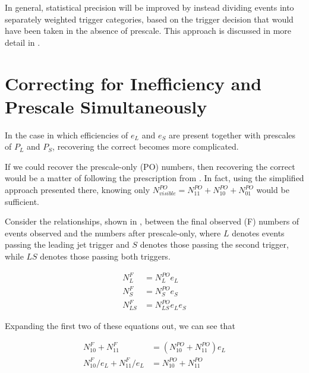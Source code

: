In general, statistical precision will be improved by instead %
dividing events into separately weighted trigger categories, based on the trigger
decision that would have been taken in the absence of prescale. This approach
is discussed in more detail in .

\section{Correcting for Inefficiency and Prescale Simultaneously}
In the case in which efficiencies of $e_L$ and $e_S$ are present together with
prescales of $P_L$ and $P_S$, recovering the correct \xs becomes more complicated.

If we could recover the prescale-only (PO) numbers, then recovering the correct
\xs would be a matter of following the prescription from .
In fact, using the simplified approach presented there, knowing only $N^{PO}_{visible} = N^{PO}_{11} + N^{PO}_{10} + N^{PO}_{01}$
would be sufficient.

Consider the relationships, shown in ,
between the final observed (F) numbers of events observed and the numbers after
prescale-only, where $L$ denotes events passing the leading jet trigger and $S$
denotes those passing the second trigger, while $LS$ denotes those passing both triggers.

\begin{equation}
\begin{split}
  N^{F}_{L}  &= N^{PO}_{L} e_L \\
  N^{F}_{S}  &= N^{PO}_{S} e_S \\
  N^{F}_{LS} &= N^{PO}_{LS} e_L e_S
  \label{eq:appendix:relationships}
\end{split}
\end{equation}

\noindent Expanding the first two of these equations out, we can see that

\begin{equation}
\begin{split}
  N^{F}_{10} + N^{F}_{11} &= ( N^{PO}_{10} + N^{PO}_{11} ) e_L \\
  N^{F}_{10} / e_L + N^{F}_{11} / e_L &= N^{PO}_{10} + N^{PO}_{11}
  \label{eq:appendix:leading_only}
\end{split}
\end{equation}

